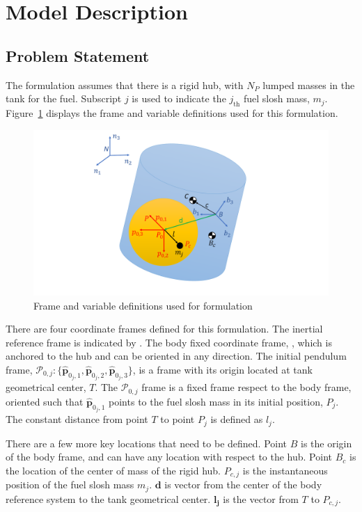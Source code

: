 \section{Model Description}

\subsection{Problem Statement}

The formulation assumes that there is a rigid hub, with $N_P$ lumped masses in the tank for the fuel. Subscript $j$ is used to indicate the $j_\text{th}$ fuel slosh mass, $m_j$. Figure~\ref{fig:Slosh_Figure} displays the frame and variable definitions used for this formulation.

\begin{figure}[ht]
	\centering
	\includegraphics[width=13cm]{Figures/spacecraft.pdf}
	\caption{Frame and variable definitions used for formulation}
	\label{fig:Slosh_Figure}
\end{figure} 

There are four coordinate frames defined for this formulation. The inertial reference frame is indicated by . The body fixed coordinate frame, , which is anchored to the hub and can be oriented in any direction. The initial pendulum frame, $\mathcal{P}_{0,j}:\{\hat{\bm p}_{0_j,1},\hat{\bm p}_{0_j,2},\hat{\bm p}_{0_j,3}\}$, is a frame with its origin located at tank geometrical center, $T$. The $\mathcal{P}_{0,j}$ frame is a fixed frame respect to the body frame, oriented such that $\hat{\bm{p}}_{0_j,1}$ points to the fuel slosh mass in its initial position, $P_{j}$. The constant distance from point $T$ to point $P_{j}$ is defined as $l_j$. 

There are a few more key locations that need to be defined. Point $B$ is the origin of the body frame, and can have any location with respect to the hub. Point $B_c$ is the location of the center of mass of the rigid hub. $P_{c,j}$ is the instantaneous position of the fuel slosh mass $m_j$. $\bm{d}$ is vector from the center of the body reference system to the tank geometrical center. $\bm{l_j}$ is the vector from $T$ to $P_{c,j}$.

